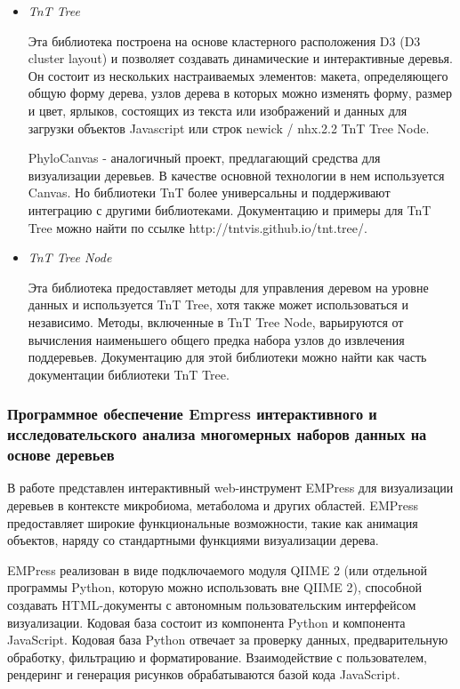 \begin{itemize}
	\item \textit{TnT Tree}
	
	Эта библиотека построена на основе кластерного расположения D3 (D3 cluster layout) и позволяет создавать динамические и интерактивные деревья. Он состоит из нескольких настраиваемых элементов: макета, определяющего общую форму дерева, узлов дерева в которых можно изменять форму, размер и цвет, ярлыков, состоящих из текста или изображений и данных для загрузки объектов Javascript или строк newick / nhx.2.2 TnT Tree Node.
	
	PhyloCanvas - аналогичный проект, предлагающий средства для визуализации деревьев. В качестве основной технологии в нем используется Canvas. Но библиотеки TnT более универсальны и поддерживают интеграцию с другими библиотеками. Документацию и примеры для TnT Tree можно найти по ссылке http://tntvis.github.io/tnt.tree/.
	
	\item \textit{TnT Tree Node}	
	
	Эта библиотека предоставляет методы для управления деревом на уровне данных и используется TnT Tree, хотя также может использоваться и независимо. Методы, включенные в TnT Tree Node, варьируются от вычисления наименьшего общего предка набора узлов до извлечения поддеревьев. Документацию для этой библиотеки можно найти как часть документации библиотеки TnT Tree.
\end{itemize}

\subsubsection{Программное обеспечение Empress интерактивного и исследовательского анализа многомерных наборов данных на основе деревьев}

В работе \cite{Cantrell2021} представлен интерактивный web-инструмент EMPress для визуализации деревьев в контексте микробиома, метаболома и других областей. EMPress предоставляет широкие функциональные возможности, такие как анимация объектов, наряду со стандартными функциями визуализации дерева.

EMPress реализован в виде подключаемого модуля QIIME 2 (или отдельной программы Python, которую можно использовать вне QIIME 2), способной создавать HTML-документы с автономным пользовательским интерфейсом визуализации. Кодовая база состоит из компонента Python и компонента JavaScript. Кодовая база Python отвечает за проверку данных, предварительную обработку, фильтрацию и форматирование. Взаимодействие с пользователем, рендеринг и генерация рисунков обрабатываются базой кода JavaScript. 

